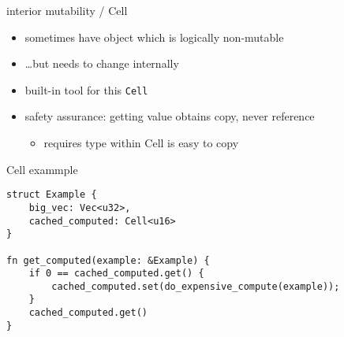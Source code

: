 \begin{frame}{interior mutability / Cell}
    \begin{itemize}
    \item sometimes have object which is logically non-mutable
    \item \ldots but needs to change internally
    \vspace{.5cm}
    \item built-in tool for this \texttt{Cell}
    \item safety assurance: getting value obtains copy, never reference
        \begin{itemize}
        \item requires type within Cell is easy to copy
        \end{itemize}
    \end{itemize}
\end{frame}

\begin{frame}[fragile]{Cell exammple}
\begin{verbatim}
struct Example {
    big_vec: Vec<u32>,
    cached_computed: Cell<u16>
}

fn get_computed(example: &Example) {
    if 0 == cached_computed.get() {
        cached_computed.set(do_expensive_compute(example));
    }
    cached_computed.get()
}
\end{verbatim}
\end{frame}


